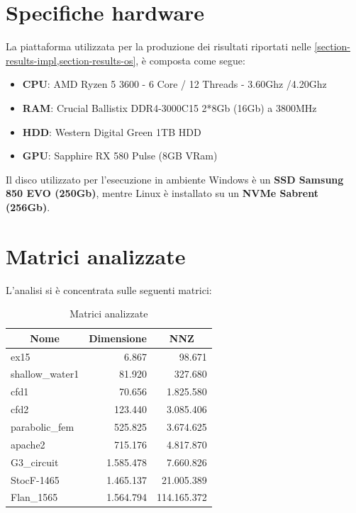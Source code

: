 \documentclass[11pt,italian]{article}
\begin{document}
\newpage
\section{Specifiche hardware}
La piattaforma utilizzata per la produzione dei risultati riportati nelle \cref{section-results-impl,section-results-os}, è composta come segue:
\begin{itemize}
    \item \textbf{CPU}: AMD Ryzen 5 3600 - 6 Core / 12 Threads - 3.60Ghz /4.20Ghz
    \item \textbf{RAM}: Crucial Ballistix DDR4-3000C15 2*8Gb (16Gb) a 3800MHz
    \item \textbf{HDD}: Western Digital Green 1TB HDD
    \item \textbf{GPU}: Sapphire RX 580 Pulse (8GB VRam)
\end{itemize}

\noindent
Il disco utilizzato per l'esecuzione in ambiente Windows è un \textbf{SSD Samsung 850 EVO (250Gb)}, mentre Linux è installato su un \textbf{NVMe Sabrent (256Gb)}.

\newpage
\section{Matrici analizzate}
L'analisi si è concentrata sulle seguenti matrici:

\begin{table}[h]
    \centering
    \begin{tabular}{|l|r|r|}
        \multicolumn{1}{c}{\textbf{Nome}} & \multicolumn{1}{c}{\textbf{Dimensione}} & \multicolumn{1}{c}{\textbf{NNZ}} \\ \hline
        ex15 & 6.867 & 98.671 \\
        shallow\_water1 & 81.920 & 327.680 \\
        cfd1 & 70.656 & 1.825.580 \\
        cfd2 & 123.440 & 3.085.406 \\
        parabolic\_fem & 525.825 & 3.674.625 \\
        apache2 & 715.176 & 4.817.870 \\
        G3\_circuit & 1.585.478 & 7.660.826 \\
        StocF-1465 & 1.465.137 & 21.005.389 \\
        Flan\_1565 & 1.564.794 & 114.165.372 \\ \hline
    \end{tabular}
    \caption{Matrici analizzate}
    \label{tab:matrix-list}
\end{table}
\end{document}

